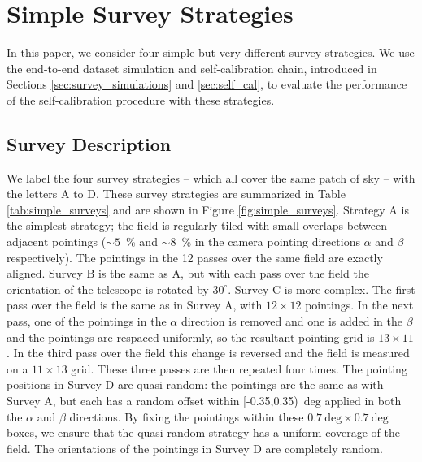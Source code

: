 \documentclass[manuscript]{aastex}
\begin{document}
\section{Simple Survey Strategies}
\label{sec:simple_surveys}
In this paper, we consider four simple but very different survey strategies. We use the end-to-end dataset simulation and self-calibration chain, introduced in Sections \ref{sec:survey_simulations} and \ref{sec:self_cal}, to evaluate the performance of the self-calibration procedure with these strategies. 

\subsection{Survey Description}
We label the four survey strategies -- which all cover the same patch of sky -- with the letters A to D. These survey strategies are summarized in Table \ref{tab:simple_surveys} and are shown in Figure \ref{fig:simple_surveys}. Strategy A is the simplest strategy; the field is regularly tiled with small overlaps between adjacent pointings ($\sim 5$~\% and $\sim 8$~\% in the camera pointing directions $\alpha$ and $\beta$ respectively). The pointings in the 12 passes over the same field are exactly aligned. Survey B is the same as A, but with each pass over the field the orientation of the telescope is rotated by $30^\circ$. Survey C is more complex. The first pass over the field is the same as in Survey A, with $12 \times 12$ pointings. In the next pass, one of the pointings in the $\alpha$ direction is removed and one is added in the $\beta$ and the pointings are respaced uniformly, so the resultant pointing grid is $13 \times 11$. In the third pass over the field this change is reversed and the field is measured on a $11 \times 13$ grid. These three passes are then repeated four times. The pointing positions in Survey D are quasi-random: the pointings are the same as with Survey A, but each has a random offset within [-0.35,0.35)~deg applied in both the $\alpha$ and $\beta$ directions. By fixing the pointings within these $0.7~\text{deg} \times 0.7~\text{deg}$ boxes, we ensure that the quasi random strategy has a uniform coverage of the field. The orientations of the pointings in Survey D are completely random.
\end{document}
